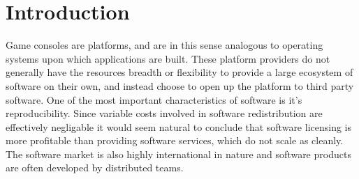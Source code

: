 \section*{Introduction}
Game consoles are platforms, and are in this sense analogous to operating systems upon which applications are built. These platform providers do not generally have the resources breadth or flexibility to provide a large ecosystem of software on their own, and instead choose to open up the platform to third party software.\autocite[30]{buxmann2012software}
One of the most important characteristics of software is it's reproducibility.\autocite[3]{buxmann2012software}
Since variable costs involved in software redistribution are effectively negligable it would seem natural to conclude that software licensing is more profitable than providing software services, which do not scale as cleanly.\autocite[3]{buxmann2012software}
The software market is also highly international in nature and software products are often developed by distributed teams.\autocite[3]{buxmann2012software}
